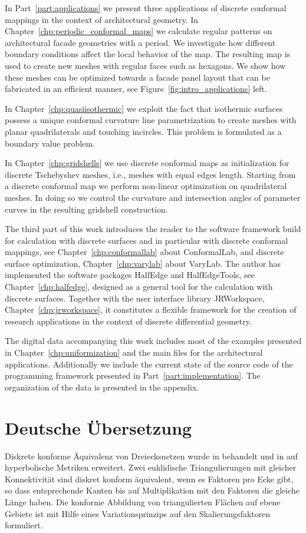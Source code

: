 \documentclass[Thesis.tex]{subfiles}
\begin{document}
In Part~\ref{part:applications} we present three applications of discrete conformal mappings in the context of architectural geometry. 
In Chapter~\ref{chp:periodic_conformal_maps} we calculate regular patterns on architectural facade geometries with a period. 
We investigate how different boundary conditions affect the local behavior of the map.
The resulting map is used to create new meshes with regular faces such as hexagons.
We show how these meshes can be optimized towards a facade panel layout that can be fabricated in an efficient manner, see Figure~\ref{fig:intro_applications} left.

In Chapter~\ref{chp:quasiisothermic} we exploit the fact that isothermic surfaces possess a unique conformal curvature line parametrization to create meshes with planar quadrilaterals and touching incircles. 
This problem is formulated as a boundary value problem. 

In Chapter~\ref{chp:gridshells} we use discrete conformal maps as initialization for discrete Tschebyshev meshes, i.e., meshes with equal edges length. 
Starting from a discrete conformal map we perform non-linear optimization on quadrilateral meshes.
In doing so we control the curvature and intersection angles of parameter curves in the resulting gridshell construction.

The third part of this work introduces the reader to the software framework build for calculation with discrete surfaces and in particular with discrete conformal mappings, see Chapter~\ref{chp:conformallab}  about {\sc ConformalLab}, and discrete surface optimization, Chapter~\ref{chp:varylab} about {\sc VaryLab}. The author has implemented the software packages {\sc HalfEdge} and {\sc HalfEdgeTools}, see Chapter~\ref{chp:halfedge}, designed as a general tool for the calculation with discrete surfaces. Together with the user interface library {\sc JRWorkspace}, Chapter~\ref{chp:jrworkspace}, it constitutes a flexible framework for the creation of research applications in the context of discrete differential geometry. 

The digital data accompanying this work includes most of the examples presented in Chapter~\ref{chp:uniformization} and the main files for the architectural applications. Additionally we include the current state of the source code of the programming framework presented in Part~\ref{part:implementation}. The organization of the data is presented in the appendix.

\section*{Deutsche \"{U}bersetzung}
Diskrete konforme \"{A}quivalenz von Dreiecksnetzen wurde in \cite{Springborn2008} behandelt und in \cite{Bobenko2010} auf hyperbolische Metriken erweitert.
Zwei euklidische Triangulierungen mit gleicher Konnektivit\"{a}t sind diskret konform \"{a}quivalent, wenn es  Faktoren pro Ecke gibt, so dass entsprechende Kanten bis auf Multiplikation mit den Faktoren die gleiche L\"{a}nge haben.
Die konforme Abbildung von triangulierten Fl\"{a}chen auf ebene Gebiete ist mit Hilfe eines Variationsprinzips auf den Skalierungsfaktoren formuliert.
\end{document}
